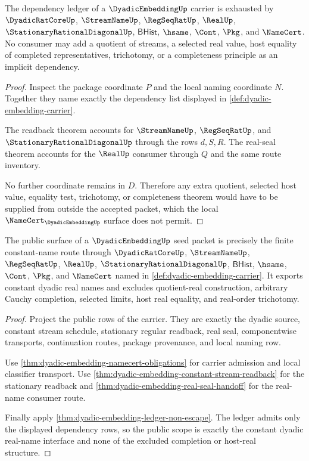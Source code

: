 \begin{theorem}
\label{thm:dyadic-embedding-ledger-non-escape}
The dependency ledger of a $\DyadicEmbeddingUp$ carrier is exhausted by $\DyadicRatCoreUp$, $\StreamNameUp$, $\RegSeqRatUp$, $\RealUp$, $\StationaryRationalDiagonalUp$, $\mathsf{BHist}$, $\hsame$, $\Cont$, $\Pkg$, and $\NameCert$. No consumer may add a quotient of streams, a selected real value, host equality of completed representatives, trichotomy, or a completeness principle as an implicit dependency.
\end{theorem}
\begin{proof}
Inspect the package coordinate $P$ and the local naming coordinate $N$. Together they name exactly the dependency list displayed in \autoref{def:dyadic-embedding-carrier}.

The readback theorem accounts for $\StreamNameUp$, $\RegSeqRatUp$, and $\StationaryRationalDiagonalUp$ through the rows $d,S,R$. The real-seal theorem accounts for the $\RealUp$ consumer through $Q$ and the same route inventory.

No further coordinate remains in $D$. Therefore any extra quotient, selected host value, equality test, trichotomy, or completeness theorem would have to be supplied from outside the accepted packet, which the local $\NameCert_{\DyadicEmbeddingUp}$ surface does not permit.
\end{proof}

\begin{theorem}
\label{thm:dyadic-embedding-public-scope}
The public surface of a $\DyadicEmbeddingUp$ seed packet is precisely the finite constant-name route through $\DyadicRatCoreUp$, $\StreamNameUp$, $\RegSeqRatUp$, $\RealUp$, $\StationaryRationalDiagonalUp$, $\mathsf{BHist}$, $\hsame$, $\Cont$, $\Pkg$, and $\NameCert$ named in \autoref{def:dyadic-embedding-carrier}. It exports constant dyadic real names and excludes quotient-real construction, arbitrary Cauchy completion, selected limits, host real equality, and real-order trichotomy.
\end{theorem}
\begin{proof}
Project the public rows of the carrier. They are exactly the dyadic source, constant stream schedule, stationary regular readback, real seal, componentwise transports, continuation routes, package provenance, and local naming row.

Use \autoref{thm:dyadic-embedding-namecert-obligations} for carrier admission and local classifier transport. Use \autoref{thm:dyadic-embedding-constant-stream-readback} for the stationary readback and \autoref{thm:dyadic-embedding-real-seal-handoff} for the real-name consumer route.

Finally apply \autoref{thm:dyadic-embedding-ledger-non-escape}. The ledger admits only the displayed dependency rows, so the public scope is exactly the constant dyadic real-name interface and none of the excluded completion or host-real structure.
\end{proof}

